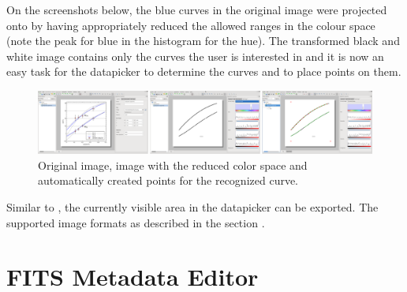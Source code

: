 On the screenshots below, the blue curves in the original image were projected onto by having appropriately reduced the allowed ranges in the colour space (note the peak for blue in the histogram for the hue).
The transformed black and white image contains only the curves the user is interested in and it is now an easy task for the datapicker to determine the curves and to place points on them.
\begin{figure}
\includegraphics[width=\textwidth]{images/datapicker_original_transformed_segments.png}
\caption{Original image, image with the reduced color space and automatically created points for the recognized curve.}
\end{figure}

Similar to , the currently visible area in the datapicker can be exported. The supported image formats as described in the section .


\section{FITS Metadata Editor}
